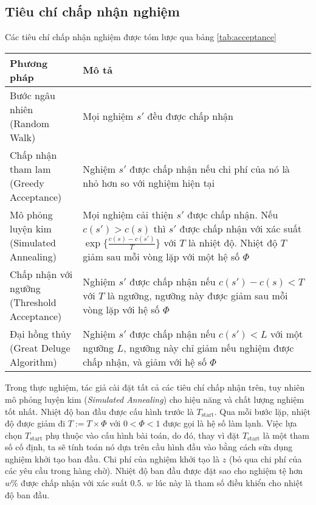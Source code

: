 \subsection{Tiêu chí chấp nhận nghiệm}

Các tiêu chí chấp nhận nghiệm được tóm lược qua bảng \ref{tab:acceptance}

\begin{table}[caption={Tiêu chí chấp nhận nghiệm}, label=tab:acceptance]
  \begin{tabularx}{\textwidth}{|l|X|}
    \hline
    Phương pháp & Mô tả \\ \hline
    \makecell[l]{Bước ngâu nhiên \\ (Random Walk)} & Mọi nghiệm $s'$ đều được chấp nhận \\ \hline
    \makecell[l]{Chấp nhận tham lam \\ (Greedy Acceptance)} & Nghiệm $s'$ được chấp nhận nếu chi phí của nó là nhỏ hơn so với nghiệm hiện tại \\ \hline
    \makecell[l]{Mô phỏng luyện kim \\ (Simulated Annealing)} & Mọi nghiệm cải thiện $s'$ được chấp nhận. Nếu $c(s') > c(s)$ thì $s'$ được chấp nhận với xác suất $\exp \{ \frac{c(s) - c(s')}{T} \}$ với $T$ là nhiệt độ. Nhiệt độ $T$ giảm sau mỗi vòng lặp với một hệ số $\Phi$ \\ \hline
    \makecell[l]{Chấp nhận với ngưỡng \\ (Threshold Acceptance)} & Nghiệm $s'$ được chấp nhận nếu $c(s') - c(s) < T$ với $T$ là ngưỡng, ngưỡng này được giảm sau mỗi vòng lặp với hệ số $\Phi$ \\ \hline
    \makecell[l]{Đại hồng thủy \\ (Great Deluge Algorithm)} & Nghiệm $s'$ được chấp nhận nếu $c(s') < L$ với một ngưỡng $L$, ngưỡng này chỉ giảm nếu nghiệm được chấp nhận, và giảm với hệ số $\Phi$ \\ \hline
    \end{tabularx}
\end{table}

Trong thực nghiệm, tác giả cài đặt tất cả các tiêu chí chấp nhận trên, tuy nhiên mô phỏng luyện kim (\textit{Simulated Annealing}) cho hiệu năng và chất lượng nghiệm tốt nhất. Nhiệt độ ban đầu được cấu hình trước là $T_{\text{start}}$. Qua mỗi bước lặp, nhiệt độ được giảm đi $T := T \times \Phi$ với $0 < \Phi < 1$ được gọi là hệ số làm lạnh. Việc lựa chọn $T_{\text{start}}$ phụ thuộc vào cấu hình bài toán, do đó, thay vì đặt $T_{\text{start}}$ là một tham số cố định, ta sẽ tính toán nó dựa trên cầu hình đầu vào bằng cách sửa dụng nghiệm khởi tạo ban đầu. Chi phí của nghiệm khởi tạo là $z$ (bỏ qua chi phí của các yêu cầu trong hàng chờ). Nhiệt độ ban đầu được đặt sao cho nghiệm tệ hơn $w\%$ được chấp nhận với xác suất $0.5$. $w$ lúc này là tham số điều khiển cho nhiệt độ ban đầu. 
